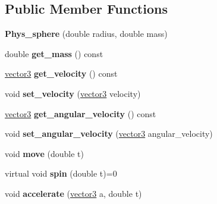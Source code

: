 \subsection*{Public Member Functions}
\begin{DoxyCompactItemize}
\item 
\hypertarget{class_phys__sphere_a7e5e2d0db4105c92a5ba6f08e920b08c}{
{\bfseries Phys\_\-sphere} (double radius, double mass)}
\label{class_phys__sphere_a7e5e2d0db4105c92a5ba6f08e920b08c}

\item 
\hypertarget{class_phys__sphere_a02f203dd23bbce2b66c3313560ca82ad}{
double {\bfseries get\_\-mass} () const }
\label{class_phys__sphere_a02f203dd23bbce2b66c3313560ca82ad}

\item 
\hypertarget{class_phys__sphere_abf87021e049fac60b9b43e69bbf6fbdf}{
\hyperlink{classvector3d}{vector3} {\bfseries get\_\-velocity} () const }
\label{class_phys__sphere_abf87021e049fac60b9b43e69bbf6fbdf}

\item 
\hypertarget{class_phys__sphere_ae19cfd6bcc7db8685cf91a7e145e31cd}{
void {\bfseries set\_\-velocity} (\hyperlink{classvector3d}{vector3} velocity)}
\label{class_phys__sphere_ae19cfd6bcc7db8685cf91a7e145e31cd}

\item 
\hypertarget{class_phys__sphere_a08f686477aa7e2915b294cb154c5d99f}{
\hyperlink{classvector3d}{vector3} {\bfseries get\_\-angular\_\-velocity} () const }
\label{class_phys__sphere_a08f686477aa7e2915b294cb154c5d99f}

\item 
\hypertarget{class_phys__sphere_a646b789422f4bb70826591c852aac7ff}{
void {\bfseries set\_\-angular\_\-velocity} (\hyperlink{classvector3d}{vector3} angular\_\-velocity)}
\label{class_phys__sphere_a646b789422f4bb70826591c852aac7ff}

\item 
\hypertarget{class_phys__sphere_acd86e2ff5ac5450b17acf517792e4363}{
void {\bfseries move} (double t)}
\label{class_phys__sphere_acd86e2ff5ac5450b17acf517792e4363}

\item 
\hypertarget{class_phys__sphere_a2ea96e50076d06843d9e7616f6d6056e}{
virtual void {\bfseries spin} (double t)=0}
\label{class_phys__sphere_a2ea96e50076d06843d9e7616f6d6056e}

\item 
\hypertarget{class_phys__sphere_ad3d8049942ddb5707af4b5df4595d6f0}{
void {\bfseries accelerate} (\hyperlink{classvector3d}{vector3} a, double t)}
\label{class_phys__sphere_ad3d8049942ddb5707af4b5df4595d6f0}


\end{DoxyCompactItemize}
